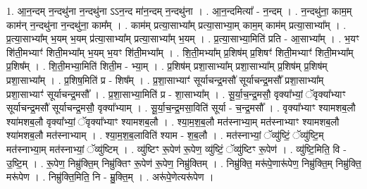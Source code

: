 \documentclass[17pt]{extarticle}
\begin{document}
1. आ॒न॒न्दम् न॒न्दथु॑ना न॒न्दथु॑ना ऽऽन॒न्द मा॑न॒न्दम् न॒न्दथु॑ना । . आ॒न॒न्दमित्या᳚ - न॒न्दम् । . न॒न्दथु॑ना॒ काम॒म् काम॑न् न॒न्दथु॑ना न॒न्दथु॑ना॒ काम᳚म् । . काम॑म् प्रत्या॒साभ्या᳚म् प्रत्या॒साभ्या॒म् काम॒म् काम॑म् प्रत्या॒साभ्या᳚म् । . प्र॒त्या॒साभ्या᳚म् भ॒यम् भ॒यम् प्र॑त्या॒साभ्या᳚म् प्रत्या॒साभ्या᳚म् भ॒यम् । . प्र॒त्या॒साभ्या॒मिति॑ प्रति - आ॒साभ्या᳚म् । . भ॒यꣳ शि॑ती॒मभ्याꣳ॑ शिती॒मभ्या᳚म् भ॒यम् भ॒यꣳ शि॑ती॒मभ्या᳚म् । . शि॒ती॒मभ्या᳚म् प्र॒शिष॑म् प्र॒शिषꣳ॑ शिती॒मभ्याꣳ॑ शिती॒मभ्या᳚म् प्र॒शिष᳚म् । . शि॒ती॒मभ्या॒मिति॑ शिती॒म - भ्या॒म् । . प्र॒शिष॑म् प्रशा॒साभ्या᳚म् प्रशा॒साभ्या᳚म् प्र॒शिष॑म् प्र॒शिष॑म् प्रशा॒साभ्या᳚म् । . प्र॒शिष॒मिति॑ प्र - शिष᳚म् । . प्र॒शा॒साभ्याꣳ॑ सूर्याचन्द्र॒मसौ॑ सूर्याचन्द्र॒मसौ᳚ प्रशा॒साभ्या᳚म् प्रशा॒साभ्याꣳ॑ सूर्याचन्द्र॒मसौ᳚ । . प्र॒शा॒साभ्या॒मिति॑ प्र - शा॒साभ्या᳚म् । . सू॒र्या॒च॒न्द्र॒मसौ॒ वृक्या᳚भ्यां॒ ॅवृक्या᳚भ्याꣳ सूर्याचन्द्र॒मसौ॑ सूर्याचन्द्र॒मसौ॒ वृक्या᳚भ्याम् । . सू॒र्या॒च॒न्द्र॒मसा॒विति॑ सूर्या - च॒न्द्र॒मसौ᳚ । . वृक्या᳚भ्याꣳ श्यामशब॒लौ श्या॑मशब॒लौ वृक्या᳚भ्यां॒ ॅवृक्या᳚भ्याꣳ श्यामशब॒लौ । . श्या॒म॒श॒ब॒लौ मत॑स्नाभ्या॒म् मत॑स्नाभ्याꣳ श्यामशब॒लौ श्या॑मशब॒लौ मत॑स्नाभ्याम् । . श्या॒म॒श॒ब॒लाविति॑ श्याम - श॒ब॒लौ । . मत॑स्नाभ्यां॒ ॅव्यु॑ष्टिं॒ ॅव्यु॑ष्टि॒म् मत॑स्नाभ्या॒म् मत॑स्नाभ्यां॒ ॅव्यु॑ष्टिम् । . व्यु॑ष्टिꣳ रू॒पेण॑ रू॒पेण॒ व्यु॑ष्टिं॒ ॅव्यु॑ष्टिꣳ रू॒पेण॑ । . व्यु॑ष्टि॒मिति॒ वि - उ॒ष्टि॒म् । . रू॒पेण॒ निम्रु॑क्ति॒म् निम्रु॑क्तिꣳ रू॒पेण॑ रू॒पेण॒ निम्रु॑क्तिम् । . निम्रु॑क्ति॒ मरू॑पे॒णारू॑पेण॒ निम्रु॑क्ति॒म् निम्रु॑क्ति॒ मरू॑पेण । . निम्रु॑क्ति॒मिति॒ नि - म्रु॒क्ति॒म् । . अरू॑पे॒णेत्यरू॑पेण । \newline
\end{document}
